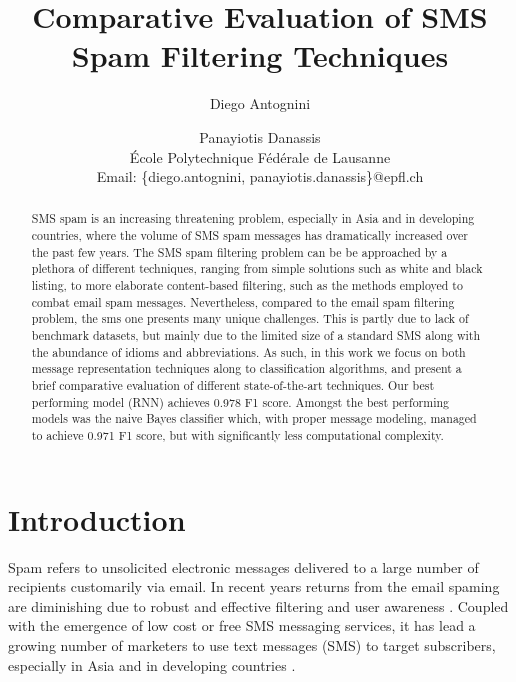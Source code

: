 \documentclass[letterpaper]{article}
\begin{document}
\title{Comparative Evaluation of SMS Spam Filtering Techniques}
\author{Diego Antognini \and Panayiotis Danassis \\
\'Ecole Polytechnique F\'ed\'erale de Lausanne \\
Email: \{diego.antognini, panayiotis.danassis\}@epfl.ch}

\maketitle

\begin{abstract}
	SMS spam is an increasing threatening problem, especially in Asia and in developing countries, where the volume of SMS spam messages has dramatically increased over the past few years. The SMS spam filtering problem can be be approached by a plethora of different techniques, ranging from simple solutions such as white and black listing, to more elaborate content-based filtering, such as the methods employed to combat email spam messages. Nevertheless, compared to the email spam filtering problem, the sms one presents many unique challenges. This is partly due to lack of benchmark datasets, but mainly due to the limited size of a standard SMS along with the abundance of idioms and abbreviations. As such, in this work we focus on both message representation techniques along to classification algorithms, and present a brief comparative evaluation of different state-of-the-art techniques. Our best performing model (RNN) achieves 0.978 F1 score. Amongst the best performing models was the naive Bayes classifier which, with proper message modeling, managed to achieve 0.971 F1 score, but with significantly less computational complexity.
\end{abstract}

\section{Introduction} \label{Introduction}

Spam refers to unsolicited electronic messages delivered to a large number of recipients customarily via email. In recent years returns from the email spaming are diminishing due to robust and effective filtering and user awareness \cite{delany2012sms}. Coupled with the emergence of low cost or free SMS messaging
services, it has lead a growing number of marketers to use text messages (SMS) to target subscribers, especially in Asia and in developing countries \cite{gomez2006content} \cite{yadav2011smsassassin}.
\end{document}
